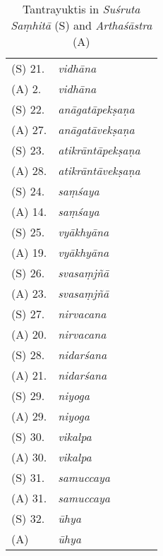 \begin{table}[h]
\begin{longtable}{m{1cm} m{2cm} p{4cm}}
	\rule{0pt}{0.5cm}(S) 21. & \textit{vidhāna} & \dev{/} \\
	(A) 2. & \textit{vidhāna} & \dev{/} \\
	
	\rule{0pt}{0.5cm}(S) 22. & \textit{anāgatāpekṣaṇa} & \dev{/} \\
	(A) 27. & \textit{anāgatāvekṣaṇa} & \dev{/} \\
	
	\rule{0pt}{0.5cm}(S) 23. & \textit{atikrāntāpekṣaṇa} & \dev{/} \\
	(A) 28. & \textit{atikrāntāvekṣaṇa} & \dev{/} \\
	
	\rule{0pt}{0.5cm}(S) 24. & \textit{saṃśaya} & \dev{/} \\
	(A) 14. & \textit{saṃśaya} & \dev{/} \\
	
	\rule{0pt}{0.5cm}(S) 25. & \textit{vyākhyāna} & \dev{/} \\
	(A) 19. & \textit{vyākhyāna} & \dev{/} \\
	
	\rule{0pt}{0.5cm}(S) 26. & \textit{svasaṃjñā} & \dev{/} \\
	(A) 23. & \textit{svasaṃjñā} & \dev{/} \\
	
	\rule{0pt}{0.5cm}(S) 27. & \textit{nirvacana} & \dev{/} \\
	(A) 20. & \textit{nirvacana} & \dev{/} \\
	
	\rule{0pt}{0.5cm}(S) 28. & \textit{nidarśana} & \dev{/} \\
	(A) 21. & \textit{nidarśana} & \dev{/} \\
	
	\rule{0pt}{0.5cm}(S) 29. & \textit{niyoga} & \dev{/} \\
	(A) 29. & \textit{niyoga} & \dev{/} \\
	
	\rule{0pt}{0.5cm}(S) 30. & \textit{vikalpa} & \dev{/} \\
	(A) 30. & \textit{vikalpa} & \dev{/} \\
	
	\rule{0pt}{0.5cm}(S) 31. & \textit{samuccaya} & \dev{/} \\
	(A) 31. & \textit{samuccaya} & \dev{/} \\
	
	\rule{0pt}{0.5cm}(S) 32. & \textit{ūhya} & \dev{/} \\
	(A) & \textit{ūhya} & \dev{/} \\
	
		
	\hline	
\end{longtable}

	
\caption{Tantrayuktis in \textit{Suśruta Saṃhitā} (S) and \textit{Arthaśāstra} (A)\label{tableSvsA}}

\end{table}

